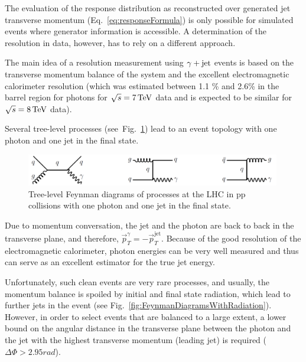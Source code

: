 
The evaluation of the response distribution as reconstructed over generated jet transverse momentum (\mbox{Eq.~\eqref{eq:responseFormula}})
is only possible for simulated events where generator information is accessible. 
A determination of the resolution in data, however, has to rely on a different approach.

The main idea of a resolution measurement using $\gamma + \text{jet}$ events is based on the transverse momentum balance of the system and the excellent electromagnetic calorimeter resolution
(which was estimated between 1.1 \% and 2.6\% in the barrel region for photons for $\sqrt{s}= 7 \,\text{Te}\kern-0.06667em\text{V}$ data \cite{bib:CMS:ECALresolution_7TeV} 
and is expected to be similar for $\sqrt{s}= 8 \,\text{Te}\kern-0.06667em\text{V}$ data).

Several tree-level processes (\mbox{see Fig. \ref{fig:FeynmanDiagrams}}) lead to an event topology with one photon and one jet in the final state. 

\begin{figure}[htp]
  \centering

      \includegraphics[width=0.99\textwidth]{figures/resolution/generalApproach/FeynmanDiagram.pdf}
 
 
  \caption{Tree-level Feynman diagrams of processes at the LHC in pp collisions with one photon and one jet in the final state.}  
  \label{fig:FeynmanDiagrams}
\end{figure}
Due to momentum conversation, the jet and the photon are back to back in the transverse plane, and therefore, $\vec{p}_{T}^{\gamma} = -\vec{p}_{T}^{\text{jet}}$. 
Because of the good resolution of the electromagnetic calorimeter, photon energies can be very well measured 
and thus can serve as an excellent estimator for the true jet energy.


Unfortunately, such clean events are very rare processes, and usually, the momentum balance is spoiled by initial and final state radiation, which lead to further jets in the event 
(see \mbox{Fig. \ref{fig:FeynmanDiagramsWithRadiation}}). 
However, in order to select events that are balanced to a large extent, a lower bound 
on the angular distance in the transverse plane between the photon and the jet with the highest transverse momentum (leading jet) is required ($\Delta\Phi>2.95\unit{rad}$). 

